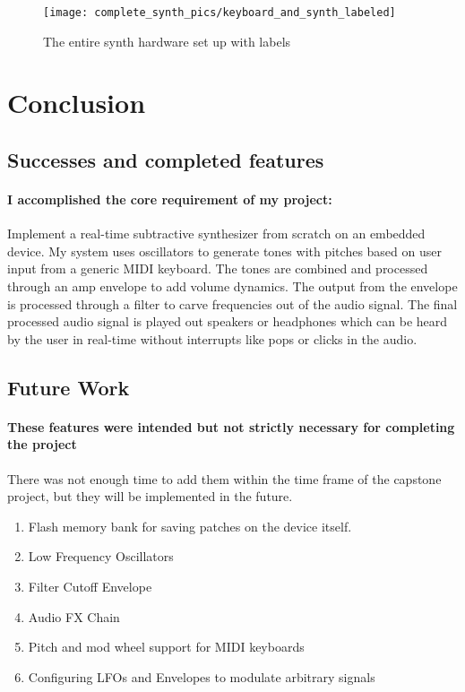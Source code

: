\documentclass[acmlarge,screen]{acmart}
\begin{document}
	\begin{figure}[H]
		\texttt{[image: complete\_synth\_pics/keyboard\_and\_synth\_labeled]}
		\caption{The entire synth hardware set up with labels}
		\centering
	\end{figure}

\section{Conclusion}
	\subsection{Successes and completed features} 
	\paragraph{I accomplished the core requirement of my project:} Implement a real-time subtractive synthesizer from scratch on an embedded device. My system uses oscillators to generate tones with pitches based on user input from a generic MIDI keyboard. The tones are combined and processed through an amp envelope to add volume dynamics. The output from the envelope is processed through a filter to carve frequencies out of the audio signal. The final processed audio signal is played out speakers or headphones which can be heard by the user in real-time without interrupts like pops or clicks in the audio.
	
	\subsection{Future Work}
	\paragraph{These features were intended but not strictly necessary for completing the project} There was not enough time to add them within the time frame of the capstone project, but they will be implemented in the future.
	\begin{enumerate}
		\item Flash memory bank for saving patches on the device itself.
		\item Low Frequency Oscillators
		\item Filter Cutoff Envelope
		\item Audio FX Chain
		\item Pitch and mod wheel support for MIDI keyboards
		\item Configuring LFOs and Envelopes to modulate arbitrary signals
	\end{enumerate}
		
\end{document}

